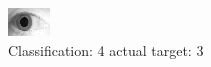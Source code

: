 \begin{figure}[h!]
\begin{center}
\includegraphics[width=0.60\columnwidth]{figures/ID1807_class_4_target_3.png}
\end{center}
\caption{ Classification: 4 actual target: 3}
\label{fig:ID1807_class_4_target_3}
\end{figure}
